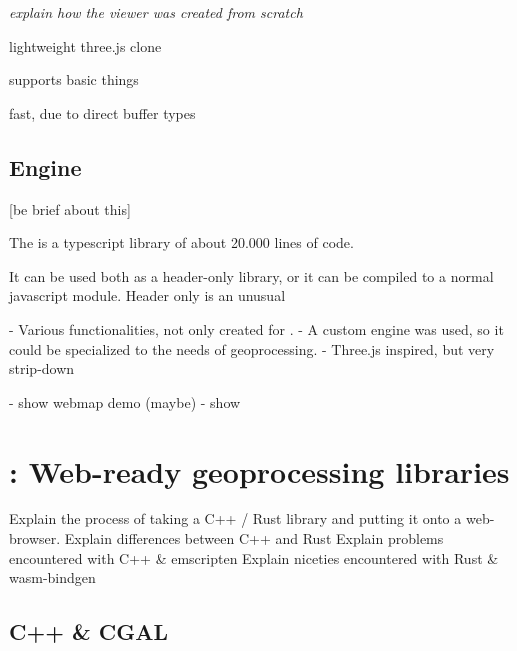 \emph{explain how the viewer was created from scratch}

lightweight three.js clone

supports basic things

fast, due to direct buffer types



\subsection{Engine}
[be brief about this]

The  is a typescript library of about 20.000 lines of code. 

It can be used both as a header-only library, or it can be compiled to a normal javascript module. 
Header only is an unusual 

- Various functionalities, not only created for \geofront{}.
- A custom engine was used, so it could be specialized to the needs of geoprocessing. 
- Three.js inspired, but very strip-down

- show webmap demo (maybe)
- show 


\newpage

\section{\mySubRQTwoTitle: Web-ready geoprocessing libraries}

\begin{note}
Explain the process of taking a C++ / Rust library and putting it onto a web-browser.
Explain differences between C++ and Rust 
Explain problems encountered with C++ & emscripten
Explain niceties encountered with Rust & wasm-bindgen
\end{note}


\subsection{C++ \& CGAL}

